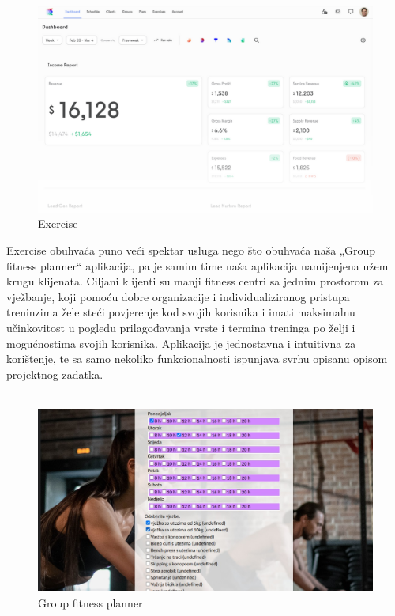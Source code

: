                  \begin{figure}[H]
                      \includegraphics[scale=0.5]{./Slike/stats.png}
                      \centering
                      \caption{Exercise}
                      \label{fig:promjene}
                \end{figure}
        {Exercise obuhvaća puno veći spektar usluga nego što obuhvaća naša „Group fitness planner“ aplikacija, pa je samim time naša aplikacija namijenjena užem krugu klijenata. Ciljani klijenti su manji fitness centri sa jednim prostorom za vježbanje, koji pomoću dobre organizacije i individualiziranog pristupa treninzima žele steći povjerenje kod svojih korisnika i imati maksimalnu učinkovitost u pogledu prilagođavanja vrste i termina treninga po želji i mogućnostima svojih korisnika. Aplikacija je jednostavna i intuitivna za korištenje, te sa samo nekoliko funkcionalnosti ispunjava svrhu opisanu opisom projektnog zadatka. \\ \\}
                \begin{figure}[H]
                      \includegraphics[scale=0.4]{./Slike/front.png}
                      \centering
                      \caption{Group fitness planner}
                      \label{fig:promjene}
                \end{figure}


